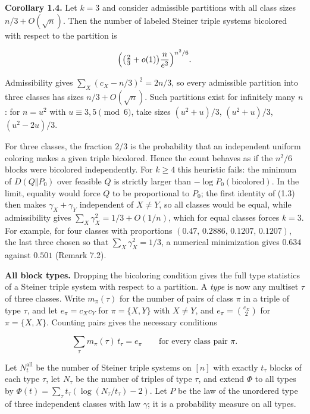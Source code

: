 \documentclass[english,11pt,a4paper]{article}
\begin{document}
\textbf{Corollary 1.4.} Let \(k=3\) and consider admissible partitions with all class sizes \(n/3+O(\sqrt n)\). Then the number of labeled Steiner triple systems bicolored with respect to the partition is

\nopagebreak[4]
\[\Bigl(\bigl(\tfrac23+o(1)\bigr)\frac{n}{e^2}\Bigr)^{n^2/6}.\]

Admissibility gives \(\sum_X(c_X-n/3)^2=2n/3\), so every admissible partition into three classes has sizes \(n/3+O(\sqrt n)\). Such partitions exist for infinitely many \(n\): for \(n=u^2\) with \(u\equiv3,5\pmod 6\), take sizes \((u^2+u)/3\), \((u^2+u)/3\), \((u^2-2u)/3\).

For three classes, the fraction \(2/3\) is the probability that an independent uniform coloring makes a given triple bicolored. Hence the count behaves as if the \(n^2/6\) blocks were bicolored independently. For \(k\ge4\) this heuristic fails: the minimum of \(D(Q\Vert P_0)\) over feasible \(Q\) is strictly larger than \(-\log P_0(\text{bicolored})\). In the limit, equality would force \(Q\) to be proportional to \(P_0\); the first identity of (1.3) then makes \(\gamma_X+\gamma_Y\) independent of \(X\ne Y\), so all classes would be equal, while admissibility gives \(\sum_X\gamma_X^2=1/3+O(1/n)\), which for equal classes forces \(k=3\). For example, for four classes with proportions \((0.47,\,0.2886,\,0.1207,\,0.1207)\), the last three chosen so that \(\sum_X\gamma_X^2=1/3\), a numerical minimization gives \(0.634\) against \(0.501\) (Remark 7.2).

\textbf{All block types.} Dropping the bicoloring condition gives the full type statistics of a Steiner triple system with respect to a partition. A \emph{type} is now any multiset \(\tau\) of three classes. Write \(m_\pi(\tau)\) for the number of pairs of class \(\pi\) in a triple of type \(\tau\), and let \(e_\pi=c_Xc_Y\) for \(\pi=\{X,Y\}\) with \(X\ne Y\), and \(e_\pi=\binom{c_X}{2}\) for \(\pi=\{X,X\}\). Counting pairs gives the necessary conditions

\nopagebreak[4]
\[\sum_\tau m_\pi(\tau)\,t_\tau=e_\pi\qquad\text{for every class pair }\pi.\tag{1.4}\]

Let \(N^{\mathrm{all}}_t\) be the number of Steiner triple systems on \([n]\) with exactly \(t_\tau\) blocks of each type \(\tau\), let \(N_\tau\) be the number of triples of type \(\tau\), and extend \(\Phi\) to all types by \(\Phi(t)=\sum_\tau t_\tau(\log(N_\tau/t_\tau)-2)\). Let \(P\) be the law of the unordered type of three independent classes with law \(\gamma\); it is a probability measure on all types.
\end{document}
